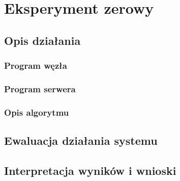 \chapter{Eksperyment zerowy}

\section{Opis działania}

\subsection{Program węzła}

\subsection{Program serwera}

\subsection{Opis algorytmu}

\section{Ewaluacja działania systemu}

\section{Interpretacja wyników i wnioski}